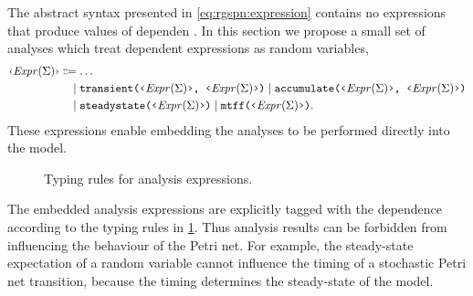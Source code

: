 The abstract syntax presented in \cref{eq:rgspn:expression} contains no expressions that produce values of dependen . In this section we propose a small set of analyses which treat  dependent expressions as random variables,
\begin{equation}
  \begin{aligned}
    \ebnfV{\rel{Expr}(\Sigma)} &\ebnfEq \ldots \\
    &\ebnfCont \lit{transient(\(\ebnfV{\rel{Expr}(\Sigma)}\), \(\ebnfV{\rel{Expr}(\Sigma)}\))} \mid \lit{accumulate(\(\ebnfV{\rel{Expr}(\Sigma)}\), \(\ebnfV{\rel{Expr}(\Sigma)}\))} \\
    &\ebnfCont \lit{steadystate(\(\ebnfV{\rel{Expr}(\Sigma)}\))} \mid \lit{mtff(\(\ebnfV{\rel{Expr}(\Sigma)}\))} \text.
  \end{aligned}
\end{equation}
These expressions enable embedding the analyses to be performed directly into the  model.

\begin{figure}
  \caption{Typing rules for analysis expressions.}
  \label{fig:rgspn:analysis-typing}
\end{figure}

The embedded analysis expressions are explicitly tagged with the  dependence according to the typing rules in \cref{fig:rgspn:analysis-typing}. Thus analysis results can be forbidden from influencing the behaviour of the Petri net. For example, the steady-state expectation of a random variable cannot influence the timing of a stochastic Petri net transition, because the timing determines the steady-state of the model.


